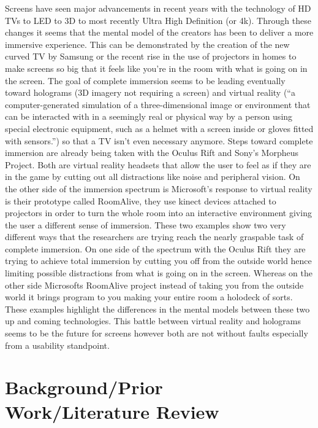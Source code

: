 \documentclass[a4paper]{article}
\begin{document}
\indent \indent Screens have seen major advancements in recent years with the technology of HD TVs to LED to 3D to most recently Ultra High Definition (or 4k). Through these changes it seems that the mental model of the creators has been to deliver a more immersive experience.
This can be demonstrated by the creation of the new curved TV by Samsung or the recent rise in the use of projectors in homes to make screens so big that it feels like you're in the room with what is going on in the screen. The goal of complete immersion seems to be leading eventually toward holograms (3D imagery not requiring a screen) and virtual reality (“a computer-generated simulation of a three-dimensional image or environment that can be interacted with in a seemingly real or physical way by a person using special electronic equipment, such as a helmet with a screen inside or gloves fitted with sensors.”\cite{1}) so that a TV isn’t even necessary anymore. Steps toward complete immersion are already being taken with the Oculus Rift and Sony's Morpheus Project.
Both are virtual reality headsets that allow the user to feel as if they are in the game by cutting out all distractions like noise and peripheral vision. On the other side of the immersion spectrum is Microsoft’s response to virtual reality is their prototype called RoomAlive, they use kinect devices attached to projectors in order to turn the whole room into an interactive environment giving the user a different sense of immersion. These two examples show two very different ways that the researchers are trying reach the nearly graspable task of complete immersion. On one side of the spectrum with the Oculus Rift they are trying to achieve total immersion by cutting you off from the outside world hence limiting possible distractions from what is going on in the screen. Whereas on the other side Microsofts RoomAlive project instead of taking you from the outside world it brings program to you making your entire room a holodeck of sorts. These examples highlight the differences in the mental models between these two up and coming technologies. This battle between virtual reality and holograms seems to be the future for screens however both are not without faults especially from a usability standpoint.


\section{Background/Prior Work/Literature Review}
\end{document}
